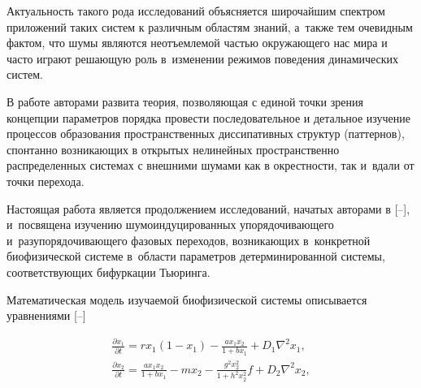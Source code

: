Актуальность такого рода исследований объясняется широчайшим спектром приложений таких систем к различным областям знаний, а~также тем очевидным фактом, что шумы являются неотъемлемой частью окружающего нас мира и часто играют решающую роль в~изменении режимов поведения динамических систем.



В работе \cite{maximov:bib:8} авторами развита теория, позволяющая с единой точки зрения концепции параметров порядка провести последовательное и детальное изучение процессов образования пространственных диссипативных структур (паттернов), спонтанно возникающих в открытых нелинейных пространственно распределенных системах с внешними шумами как в окрестности, так и~вдали от точки перехода.



Настоящая работа является продолжением исследований, начатых авторами в [--], и~посвящена изучению шумоиндуцированных упорядочивающего и~разупорядочивающего фазовых переходов, возникающих в~конкретной биофизической системе в~области параметров детерминированной системы, соответствующих бифуркации Тьюринга.



\smallskip




Математическая модель изучаемой биофизической системы описывается уравнениями [--]

\begin{equation}

\label{maxim:eq1}

\begin{array}{l}

\displaystyle

 {\frac{{\partial x_{1}}} {{\partial t}}} = rx_{1} (1 - x_{1} ) -

{\frac{{ax_{1}x_{2}}} {{1 + bx_{1}}} } + D_{1} \nabla ^{2}x_{1} , \\

\displaystyle

 {\frac{{\partial x_{2}}} {{\partial t}}} = {\frac{{ax_{1}x_{2}}} {{1 + bx_{1}

}}} - mx_{2} - {\frac{{g^{2}x_{2}^{2}}} {{1 + h^{2}x_{2}^{2}}} }f +

D_{2} \nabla ^{2}x_{2} , 

\end{array}

\end{equation}

